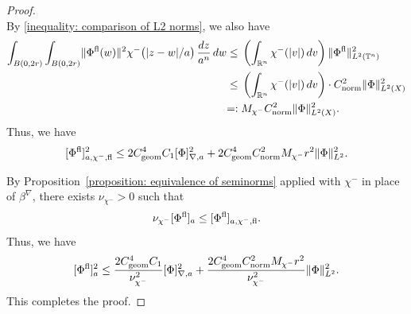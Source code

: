 \documentclass[a4paper,oneside,12pt]{amsart}
\theoremstyle{plain}
\theoremstyle{definition}
\theoremstyle{remark}
\newcommand{\R}{\mathbb{R}}
\DeclarePairedDelimiter{\abs}{\lvert}{\rvert}
\DeclarePairedDelimiter{\norm}{\lVert}{\rVert}
\DeclarePairedDelimiter{\seminorm}{\lbrack}{\rbrack}
\newcommand{\flattorus}{\mathbb{T}^n}
\newcommand{\Ltwonorm}[2][L^2]{\norm{#2}_{#1}}
\newcommand{\mesoscopicseminorm}[2][a]{\seminorm{#2}_{#1}}
\newcommand{\mesoscopicdifferenceseminorm}[2][a]{\seminorm{#2}_{\nabla,#1}}
\newcommand{\flatmesoscopicdifferenceseminorm}[3][a]{\seminorm{#3}_{#1,#2,\mathrm{fl}}}
\newcommand{\cutoff}{\beta}
\newcommand{\cutoffnabla}{\cutoff^{\nabla}}
\newcommand{\cutofflower}{\chi^-}
\newcommand{\flatmodel}[1]{#1^{\mathrm{fl}}}
\newcommand{\constantgeometric}{C_{\mathrm{geom}}}
\newcommand{\constantLtwonorm}{C_{\mathrm{norm}}}
\begin{document}
\begin{proof}
\begin{equation}
  \end{equation}
  By \eqref{inequality: comparison of L2 norms}, we also have
  \begin{equation}
    \begin{aligned}
    \int_{B(0,2r)} \int_{B(0,2r)} \norm{\flatmodel{\Phi}(w)}^2 \cutofflower\bigl(\abs{z-w}/a\bigr) \,\frac{dz}{a^n} \,dw \le{}& \left(\int_{\R^n} \cutofflower(\abs{v}) \,dv \right) \Ltwonorm[L^2(\flattorus)]{\flatmodel{\Phi}}^2 \\
    \le{}& \left(\int_{\R^n} \cutofflower(\abs{v}) \,dv \right) \cdot \constantLtwonorm^2 \Ltwonorm[L^2(X)]{\Phi}^2 \\
    =:{}& M_{\cutofflower} \constantLtwonorm^2 \Ltwonorm[L^2(X)]{\Phi}^2.
    \end{aligned}
  \end{equation}
  Thus, we have
  \begin{equation}
    \flatmesoscopicdifferenceseminorm{\cutofflower}{\flatmodel{\Phi}}^2 \le 2\constantgeometric^4 C_1 \mesoscopicdifferenceseminorm{\Phi}^2 + 2 \constantgeometric^4 \constantLtwonorm^2 M_{\cutofflower} r^2 \Ltwonorm{\Phi}^2.
  \end{equation}

  By Proposition~\ref{proposition: equivalence of seminorms} applied with
  $\cutofflower$ in place of $\cutoffnabla$, there exists $\nu_{\cutofflower} > 0$ such that
  \begin{equation}
    \nu_{\cutofflower} \mesoscopicseminorm{\flatmodel{\Phi}} \le \flatmesoscopicdifferenceseminorm{\cutofflower}{\flatmodel{\Phi}}.
  \end{equation}
  Thus, we have
  \begin{equation}
    \mesoscopicseminorm{\flatmodel{\Phi}}^2 \le \frac{2\constantgeometric^4 C_1}{\nu_{\cutofflower}^2} \mesoscopicdifferenceseminorm{\Phi}^2 + \frac{2 \constantgeometric^4 \constantLtwonorm^2 M_{\cutofflower} r^2}{\nu_{\cutofflower}^2} \Ltwonorm{\Phi}^2.
  \end{equation}
  This completes the proof.
\end{proof}
\end{document}
